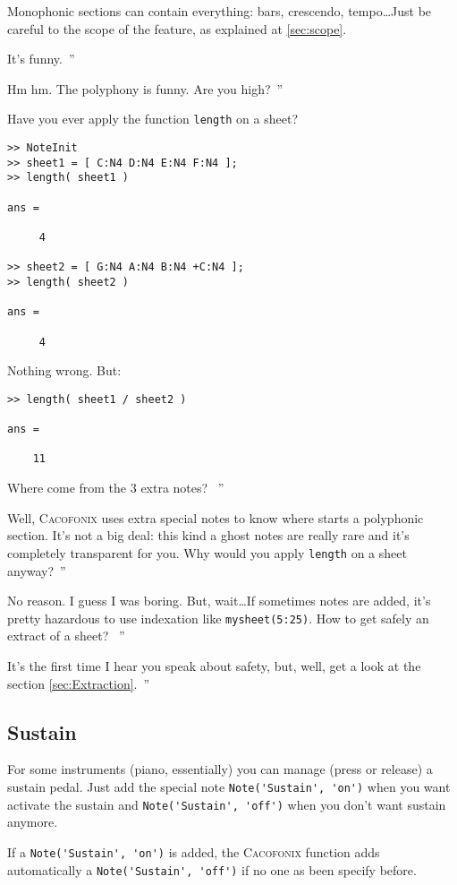 \documentclass{article}
\newcommand{\cacofonix}{\textsc{Cacofonix}\xspace}
\newenvironment{meenv}{ \par \noindent \makebox[6em][r]{ \textcolor{mecolor}{Me}: `` --~}}{~''}
\newenvironment{myselfenv}{ \par \noindent \makebox[6em][r]{ \textcolor{myselfcolor}{Myself}: `` --~}}{~''}
\newcommand{\me}[1]{\begin{meenv}#1\end{meenv}}
\newcommand{\myself}[1]{\begin{myselfenv}#1\end{myselfenv}}
\begin{document}
Monophonic sections can contain everything: bars, crescendo, tempo\dots Just be careful to the scope of the feature, as explained at \ref{sec:scope}.

\me{It's funny.}
\myself{Hm hm. The polyphony is funny. Are you high?}
\begin{meenv}%
Have you ever apply the function \lstinline!length! on a sheet?
\begin{lstlisting}
>> NoteInit
>> sheet1 = [ C:N4 D:N4 E:N4 F:N4 ];
>> length( sheet1 )

ans =

     4

>> sheet2 = [ G:N4 A:N4 B:N4 +C:N4 ];
>> length( sheet2 )

ans =

     4

\end{lstlisting}
Nothing wrong. But:
\begin{lstlisting}
>> length( sheet1 / sheet2 )

ans =

    11

\end{lstlisting}
Where come from the $3$ extra notes?%
\end{meenv}
\myself{Well, \cacofonix uses extra special notes to know where starts a polyphonic section. It's not a big deal: this kind a ghost notes are really rare and it's completely transparent for you. Why would you apply \lstinline!length! on a sheet anyway?}
\begin{meenv}%
No reason. I guess I was boring. But, wait\dots If sometimes notes are added, it's pretty hazardous to use indexation like \lstinline!mysheet(5:25)!. How to get safely an extract of a sheet?%
\end{meenv}
\myself{It's the first time I hear you speak about safety, but, well, get a look at the section \ref{sec:Extraction}.} 

\subsection{Sustain}
\label{sec:Sustain}

For some instruments (piano, essentially) you can manage (press or release) a sustain pedal. Just add the special note \lstinline!Note('Sustain', 'on')! when you want activate the sustain and \lstinline!Note('Sustain', 'off')! when you don't want sustain anymore.

If a \lstinline!Note('Sustain', 'on')! is added, the \cacofonix function adds automatically a \lstinline!Note('Sustain', 'off')! if no one as been specify before.
\end{document}
